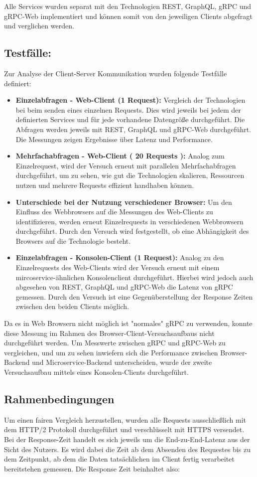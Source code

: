 Alle Services wurden separat mit den Technologien REST, GraphQL, gRPC und gRPC-Web implementiert und können somit von den jeweiligen Clients abgefragt und verglichen werden.

\subsection*{Testfälle:}
Zur Analyse der Client-Server Kommunikation wurden folgende Testfälle definiert:  
\begin{itemize}
	\item \textbf{Einzelabfragen - Web-Client (1 Request):} Vergleich der Technologien bei beim senden eines einzelnen Requests. Dies wird jeweils bei jedem der definierten Services und für jede vorhandene Datengröße durchgeführt. Die Abfragen werden jeweils mit REST, GraphQL und gRPC-Web durchgeführt. Die Messungen zeigen Ergebnisse über Latenz und Performance.
	\item \textbf{Mehrfachabfragen - Web-Client ( 20 Requests ):} Analog zum Einzelrequest, wird der Versuch erneut mit parallelen Mehrfachabfragen durchgeführt, um zu sehen, wie gut die Technologien skalieren, Ressourcen nutzen und mehrere Requests effizient handhaben können.  
	\item \textbf{Unterschiede bei der Nutzung verschiedener Browser:} Um den Einfluss des Webbrowsers auf die Messungen des Web-Clients zu identifizieren, werden erneut Einzelrequests in verschiedenen Webbrowsern durchgeführt. Durch den Versuch wird festgestellt, ob eine Abhängigkeit des Browsers auf die Technologie besteht.
	\item \textbf{Einzelabfragen - Konsolen-Client (1 Request):} Analog zu den Einzelrequests des Web-Clients wird der Versuch erneut mit einem mircoservice-ähnlichen Konsolenclient durchgeführt. Hierbei wird jedoch auch abgesehen von REST, GraphQL und gRPC-Web die Latenz von gRPC gemessen. Durch den Versuch ist eine Gegenüberstellung der Response Zeiten zwischen den beiden Clients möglich.
\end{itemize}

Da es in Web Browsern nicht möglich ist "normales" gRPC zu verwenden, konnte diese Messung im Rahmen des Browser-Client-Versuchsaufbaus nicht durchgeführt werden. Um Messwerte zwischen gRPC und gRPC-Web zu vergleichen, und um zu sehen inwiefern sich die Performance zwischen Browser-Backend und Microservice-Backend unterscheiden, wurde der zweite Versuchsaufbau mittels eines Konsolen-Clients durchgeführt.

\subsection*{Rahmenbedingungen}
Um einen fairen Vergleich herzustellen, wurden alle Requests ausschließlich mit dem HTTP/2 Protokoll durchgeführt und verschlüsselt mit HTTPS versendet. Bei der Response-Zeit handelt es sich jeweils um die End-zu-End-Latenz aus der Sicht des Nutzers. Es wird dabei die Zeit ab dem Absenden des Requestes bis zu dem Zeitpunkt, ab dem die Daten tatsächlichen im Client fertig verarbeitet bereitstehen gemessen. Die Response Zeit beinhaltet also: 

